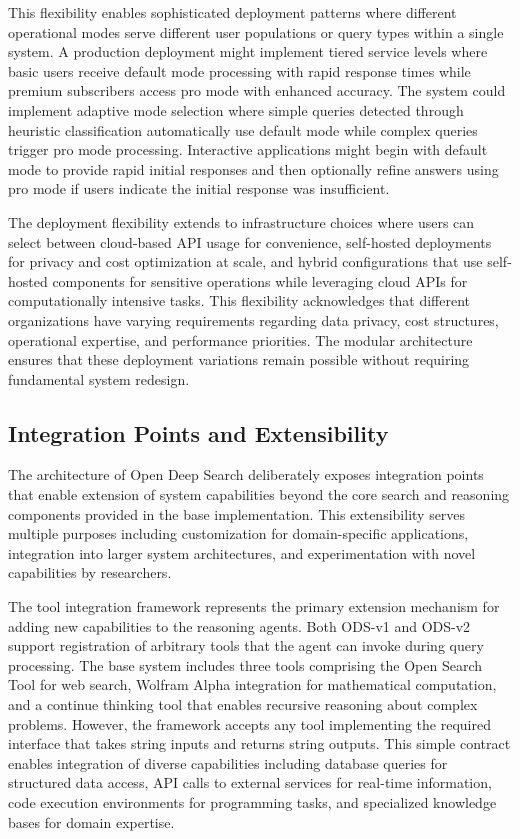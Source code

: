 This flexibility enables sophisticated deployment patterns where different operational modes serve different user populations or query types within a single system. A production deployment might implement tiered service levels where basic users receive default mode processing with rapid response times while premium subscribers access pro mode with enhanced accuracy. The system could implement adaptive mode selection where simple queries detected through heuristic classification automatically use default mode while complex queries trigger pro mode processing. Interactive applications might begin with default mode to provide rapid initial responses and then optionally refine answers using pro mode if users indicate the initial response was insufficient.

The deployment flexibility extends to infrastructure choices where users can select between cloud-based API usage for convenience, self-hosted deployments for privacy and cost optimization at scale, and hybrid configurations that use self-hosted components for sensitive operations while leveraging cloud APIs for computationally intensive tasks. This flexibility acknowledges that different organizations have varying requirements regarding data privacy, cost structures, operational expertise, and performance priorities. The modular architecture ensures that these deployment variations remain possible without requiring fundamental system redesign.

\subsection{Integration Points and Extensibility}

The architecture of Open Deep Search deliberately exposes integration points that enable extension of system capabilities beyond the core search and reasoning components provided in the base implementation. This extensibility serves multiple purposes including customization for domain-specific applications, integration into larger system architectures, and experimentation with novel capabilities by researchers.

The tool integration framework represents the primary extension mechanism for adding new capabilities to the reasoning agents. Both ODS-v1 and ODS-v2 support registration of arbitrary tools that the agent can invoke during query processing. The base system includes three tools comprising the Open Search Tool for web search, Wolfram Alpha integration for mathematical computation, and a continue thinking tool that enables recursive reasoning about complex problems. However, the framework accepts any tool implementing the required interface that takes string inputs and returns string outputs. This simple contract enables integration of diverse capabilities including database queries for structured data access, API calls to external services for real-time information, code execution environments for programming tasks, and specialized knowledge bases for domain expertise.


